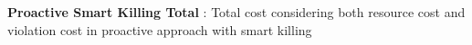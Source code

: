 \textbf{Proactive Smart Killing Total} : Total cost considering both resource cost and violation cost in proactive approach with smart killing
